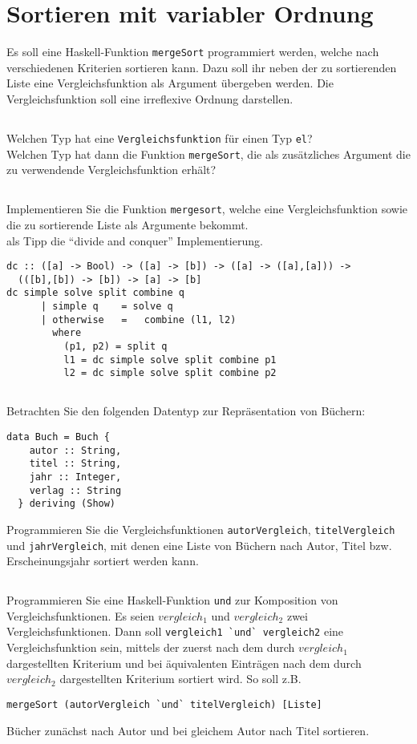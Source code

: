 \documentclass[
  10pt,                   %
  DIV12,
  german,                 %
  oneside,                %
  parskip=half,           %
  headings=normal,        %
  captions=tableheading,  %
]{scrartcl}
\begin{document}
\section{Sortieren mit variabler Ordnung}
Es soll eine Haskell-Funktion \lstinline|mergeSort| programmiert werden, welche nach verschiedenen
Kriterien sortieren kann. Dazu soll ihr neben der zu sortierenden Liste eine
Vergleichsfunktion als Argument übergeben werden. Die Vergleichsfunktion soll eine
irreflexive Ordnung darstellen.
\subsection{}
Welchen Typ hat eine \lstinline|Vergleichsfunktion| für einen Typ \lstinline|el|?\\
Welchen Typ hat dann die Funktion \lstinline|mergeSort|, die als zusätzliches Argument die
zu verwendende Vergleichsfunktion erhält?
\subsection{}
Implementieren Sie die Funktion \lstinline|mergesort|, welche eine Vergleichsfunktion sowie die zu sortierende Liste als Argumente bekommt.\\
als Tipp die "`divide and conquer"' Implementierung.
\begin{lstlisting}
dc :: ([a] -> Bool) -> ([a] -> [b]) -> ([a] -> ([a],[a])) -> 
  (([b],[b]) -> [b]) -> [a] -> [b]
dc simple solve split combine q 
      | simple q 	= solve q
      | otherwise 	= 	combine (l1, l2)
        where 
          (p1, p2) = split q
          l1 = dc simple solve split combine p1
          l2 = dc simple solve split combine p2	
\end{lstlisting}
\subsection{}
Betrachten Sie den folgenden Datentyp zur Repräsentation von Büchern:
\begin{lstlisting}
data Buch = Buch {
    autor :: String,
    titel :: String,
    jahr :: Integer,
    verlag :: String
  } deriving (Show)
\end{lstlisting}
Programmieren Sie die Vergleichsfunktionen \lstinline|autorVergleich|, \lstinline|titelVergleich| und
\lstinline|jahrVergleich|, mit denen eine Liste von Büchern nach Autor, Titel bzw. Erscheinungsjahr
sortiert werden kann.
\subsection{}
Programmieren Sie eine Haskell-Funktion \lstinline|und| zur Komposition von Vergleichsfunktionen.
Es seien $vergleich_1$ und $vergleich_2$ zwei Vergleichsfunktionen. Dann soll
\lstinline|vergleich1 `und` vergleich2| eine Vergleichsfunktion sein, mittels der zuerst nach dem
durch $vergleich_1$ dargestellten Kriterium und bei äquivalenten Einträgen nach dem
durch $vergleich_2$ dargestellten Kriterium sortiert wird. So soll z.B.
\begin{center}
\lstinline|mergeSort (autorVergleich `und` titelVergleich) [Liste]|
\end{center}
Bücher zunächst nach Autor und bei gleichem Autor nach Titel sortieren.
\end{document}
